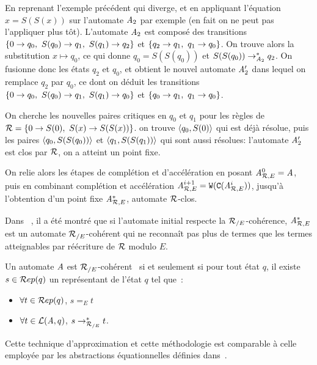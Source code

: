 \begin{example}
  En reprenant l'exemple précédent qui diverge, et en appliquant l'équation $x = S(S(x))$ sur
  l'automate $\mathit A_2$ par exemple (en fait on ne peut pas l'appliquer plus tôt).
  L'automate $\mathit A_2$ est composé des transitions $\{ 0 \rightarrow q_0,\ S(q_0) \rightarrow q_1,\ S(q_1) \rightarrow q_2\}$
  et $\{ q_2 \rightarrow q_1,\ q_1 \rightarrow q_0\}$.
  On trouve alors la substitution $x \mapsto q_0$, ce qui donne $q_0 = S(S(q_0))$ et $S(S(q_0)) \rightarrow^*_{\mathit A_2} q_2$.
  On fusionne donc les états $q_2$ et $q_0$, et obtient le nouvel automate $\mathit A_2'$ dans lequel on remplace
  $q_2$ par $q_0$, ce dont on déduit les transitions $\{ 0 \rightarrow q_0,\ S(q_0) \rightarrow q_1,\ S(q_1) \rightarrow q_0\}$
  et $\{ q_0 \rightarrow q_1,\ q_1 \rightarrow q_0\}$.
  
  On cherche les nouvelles paires critiques en $q_0$ et $q_1$ pour les règles de $\mathcal R = \{0 \rightarrow S(0),\ S(x) \rightarrow S(S(x))\}$.
  on trouve $\langle q_0, S(0)\rangle$ qui est déjà résolue, puis les paires $\langle q_0,S(S(q_0))\rangle$ et $\langle q_1,S(S(q_1))\rangle$
  qui sont aussi résolues: l'automate $\mathit A_2'$ est clos par $\mathcal R$, on a atteint un point fixe.
\end{example}


On relie alors les étapes de complétion et d'accélération en posant ${\mathit A}_{\mathcal R,E}^0=\mathit A$, puis en combinant
complétion et accélération ${\mathit A}_{\mathcal R,E}^{i+1}= \mathtt{W}(\mathtt{C}({\mathit A}_{\mathcal R,E}^i))$, jusqu'à l'obtention d'un point fixe
$\mathit A^*_{\mathcal R,E}$, automate $\mathcal R$-clos.

Dans ~\cite{GenetR-JSC10}, il a été montré que si l'automate initial respecte la ${\mathcal R_{/E}}$-cohérence,
$\mathit A^*_{\mathcal R,E}$ est un automate ${\mathcal R_{/E}}$-cohérent qui ne reconnaît pas plus de termes que les termes atteignables
par réécriture de $\mathcal R$ modulo $E$.
\begin{definition}
  \label{def:re-coherence}
  Un automate $\mathit A$ est ${\mathcal R_{/E}}$-cohérent~\cite{GenetR-JSC10} si et seulement si pour tout état $q$, il existe 
  $s \in \mathcal R ep(q)$ un représentant de l'état $q$ tel que~:
  \begin{itemize}
  \item $\forall t \in \mathcal R ep(q)$, $s =_E t$
  \item $\forall t \in \mathcal{L}(\mathit A, q)$, $s \rightarrow_{\mathcal R_{/E}}^* t$.
  \end{itemize}
\end{definition}

Cette technique d'approximation et cette méthodologie est comparable à celle employée 
par les abstractions équationnelles définies dans~\cite{MeseguerPM-TCS08}.


